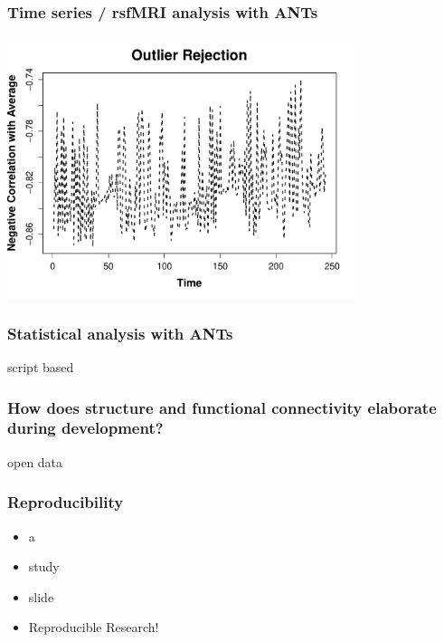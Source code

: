 \documentclass[18pt]{beamer}
\begin{document}
\begin{frame}
\frametitle{Time series / rsfMRI analysis with ANTs}
\includegraphics[width=4in]{../figures/rsfmriplot2.pdf}
\end{frame}


\begin{frame}
\frametitle{Statistical analysis with ANTs}
script based 
\end{frame}

\begin{frame}
\frametitle{How does structure and functional connectivity elaborate during development?}
open data
\end{frame}


\begin{frame}
\frametitle{Reproducibility}
\Huge
\begin{itemize}
\item a
\pause
\item study
\pause
\item slide
\pause
\item Reproducible Research!
\end{itemize}
\end{frame}
\end{document}

